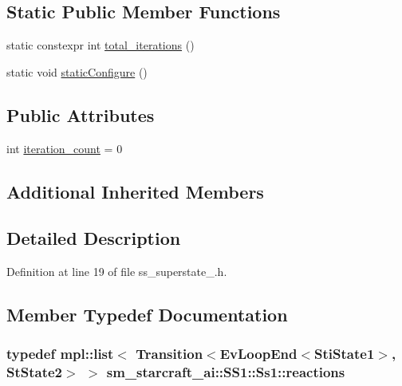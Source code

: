 \subsection*{Static Public Member Functions}
\begin{DoxyCompactItemize}
\item 
static constexpr int \hyperlink{structsm__starcraft__ai_1_1SS1_1_1Ss1_a8b0481bbe56ae90d2bbc950ae9f13179}{total\+\_\+iterations} ()
\item 
static void \hyperlink{structsm__starcraft__ai_1_1SS1_1_1Ss1_ad44d9d8f1eb9f6c12fd839e9797637e5}{static\+Configure} ()
\end{DoxyCompactItemize}
\subsection*{Public Attributes}
\begin{DoxyCompactItemize}
\item 
int \hyperlink{structsm__starcraft__ai_1_1SS1_1_1Ss1_a817456a4e8641d26d86335b1d46ee668}{iteration\+\_\+count} = 0
\end{DoxyCompactItemize}
\subsection*{Additional Inherited Members}


\subsection{Detailed Description}


Definition at line 19 of file ss\+\_\+superstate\+\_.\+h.



\subsection{Member Typedef Documentation}
\subsubsection[{\texorpdfstring{reactions}{reactions}}]{\setlength{\rightskip}{0pt plus 5cm}typedef mpl\+::list$<$ Transition$<$Ev\+Loop\+End$<${\bf Sti\+State1}$>$, {\bf St\+State2}$>$ $>$ {\bf sm\+\_\+starcraft\+\_\+ai\+::\+S\+S1\+::\+Ss1\+::reactions}}\hypertarget{structsm__starcraft__ai_1_1SS1_1_1Ss1_a847eb8599ebcda8061108c3770c1c648}{}\label{structsm__starcraft__ai_1_1SS1_1_1Ss1_a847eb8599ebcda8061108c3770c1c648}



